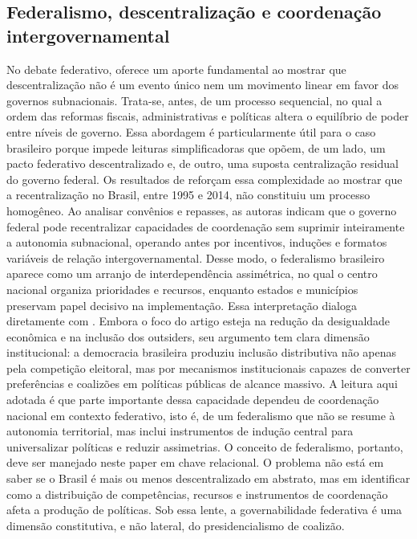 \documentclass[12pt,a4paper]{article}
\begin{document}
\subsection{Federalismo, descentralização e coordenação intergovernamental}
\label{sec:orge44f6d6}
No debate federativo, \textcite{falleti2005_a_sequential} oferece um aporte fundamental ao mostrar que descentralização não é um evento único nem um movimento linear em favor dos governos subnacionais. Trata-se, antes, de um processo sequencial, no qual a ordem das reformas fiscais, administrativas e políticas altera o equilíbrio de poder entre níveis de governo. Essa abordagem é particularmente útil para o caso brasileiro porque impede leituras simplificadoras que opõem, de um lado, um pacto federativo descentralizado e, de outro, uma suposta centralização residual do governo federal.
Os resultados de \textcite{oliveira2019_momentos_da} reforçam essa complexidade ao mostrar que a recentralização no Brasil, entre 1995 e 2014, não constituiu um processo homogêneo. Ao analisar convênios e repasses, as autoras indicam que o governo federal pode recentralizar capacidades de coordenação sem suprimir inteiramente a autonomia subnacional, operando antes por incentivos, induções e formatos variáveis de relação intergovernamental. Desse modo, o federalismo brasileiro aparece como um arranjo de interdependência assimétrica, no qual o centro nacional organiza prioridades e recursos, enquanto estados e municípios preservam papel decisivo na implementação.
Essa interpretação dialoga diretamente com \textcite{arretche2018_democracia_e}. Embora o foco do artigo esteja na redução da desigualdade econômica e na inclusão dos outsiders, seu argumento tem clara dimensão institucional: a democracia brasileira produziu inclusão distributiva não apenas pela competição eleitoral, mas por mecanismos institucionais capazes de converter preferências e coalizões em políticas públicas de alcance massivo. A leitura aqui adotada é que parte importante dessa capacidade dependeu de coordenação nacional em contexto federativo, isto é, de um federalismo que não se resume à autonomia territorial, mas inclui instrumentos de indução central para universalizar políticas e reduzir assimetrias.
O conceito de federalismo, portanto, deve ser manejado neste paper em chave relacional. O problema não está em saber se o Brasil é mais ou menos descentralizado em abstrato, mas em identificar como a distribuição de competências, recursos e instrumentos de coordenação afeta a produção de políticas. Sob essa lente, a governabilidade federativa é uma dimensão constitutiva, e não lateral, do presidencialismo de coalizão.
\end{document}
